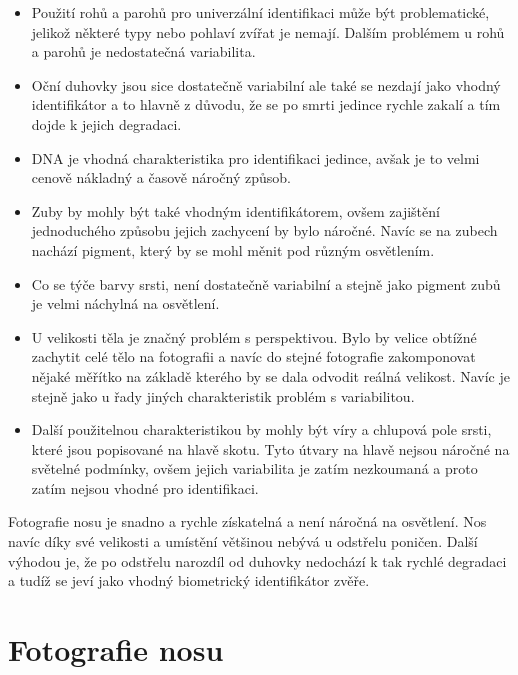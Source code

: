 \begin{itemize}
    \item Použití rohů a parohů pro univerzální identifikaci může být problematické, jelikož některé typy nebo pohlaví zvířat je nemají. Dalším problémem u rohů a parohů je nedostatečná variabilita. 

    \item Oční duhovky jsou sice dostatečně variabilní ale také se nezdají jako vhodný identifikátor a to hlavně z důvodu, že se po smrti jedince rychle zakalí a tím dojde k jejich degradaci.

    \item DNA je vhodná charakteristika pro identifikaci jedince, avšak je to velmi cenově nákladný a časově náročný způsob. 

    \item Zuby by mohly být také vhodným identifikátorem, ovšem zajištění jednoduchého způsobu jejich zachycení by bylo náročné. Navíc se na zubech nachází pigment, který by se mohl měnit pod různým osvětlením. 

    \item Co se týče barvy srsti, není dostatečně variabilní a stejně jako pigment zubů je velmi náchylná na osvětlení.

    \item U velikosti těla je značný problém s perspektivou. Bylo by velice obtížné zachytit celé tělo na fotografii a navíc do stejné fotografie zakomponovat nějaké měřítko na základě kterého by se dala odvodit reálná velikost. Navíc je stejně jako u řady jiných charakteristik problém s variabilitou.

    \item Další použitelnou charakteristikou by mohly být víry a chlupová pole srsti, které jsou popisované na hlavě skotu. Tyto útvary na hlavě nejsou náročné na světelné podmínky, ovšem jejich variabilita je zatím nezkoumaná a proto zatím nejsou vhodné pro identifikaci.
\end{itemize}

Fotografie nosu je snadno a rychle získatelná a není náročná na osvětlení. Nos navíc díky své velikosti a umístění většinou nebývá u odstřelu poničen. Další výhodou je, že po odstřelu narozdíl od duhovky nedochází k tak rychlé degradaci a tudíž se jeví jako vhodný biometrický identifikátor zvěře.



\section{Fotografie nosu}
\label{Fotografie nosu}

